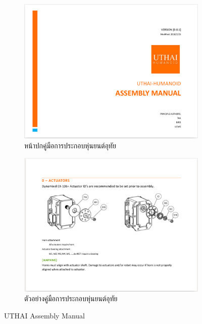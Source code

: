 \begin{figure}[!ht]
    \centering
    \begin{subfigure}[b]{0.45\textwidth}
        \centering
        \includegraphics[width=\textwidth]{chapter4/images/uthai_manual/uthai_assembly.png}
        \caption{หน้าปกคู่มือการประกอบหุ่นยนต์อุทัย}
    \end{subfigure}
    \hfill
    \begin{subfigure}[b]{0.45\textwidth}
        \centering
        \includegraphics[width=\textwidth]{chapter4/images/uthai_manual/uthai_assembly2.png}
        \caption{ตัวอย่างคู่มือการประกอบหุ่นยนต์อุทัย}
    \end{subfigure}
    \caption{UTHAI Assembly Manual}
	\label{fig:uthai_assembly_manual}
\end{figure}
